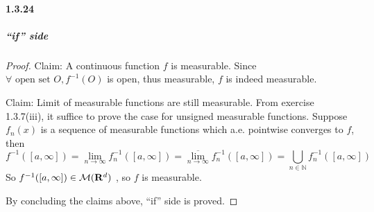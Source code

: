 \documentclass{article}
\begin{document}
\paragraph{1.3.24}

\subparagraph{``if'' side}
\begin{proof}
Claim: A continuous function $f$ is measurable. Since $\forall \text{ open set }O, f^{-1}(O) $ is open, thus measurable, $f$ is indeed measurable. 

Claim: Limit of measurable functions are still measurable. From exercise 1.3.7(iii), it suffice to prove the case for unsigned measurable functions. Suppose $f_n(x)$ is a sequence of measurable functions which a.e. pointwise converges to $f$, then 
\[f^{-1}([a,\infty])= \lim_{n\to\infty}f_n^{-1}([a,\infty])=\overline{\lim_{n\to\infty}}f^{-1}_n([a,\infty])= \bigcup_{n\in\mathbb{N}}f_n^{-1}([a,\infty])\]
So $f^{-1}([a,\infty])\in\mathcal{M}(\mathbf{R}^d)$ , so $f$ is measurable.

By concluding the claims above, ``if'' side is proved. 
\end{proof}
\end{document}
